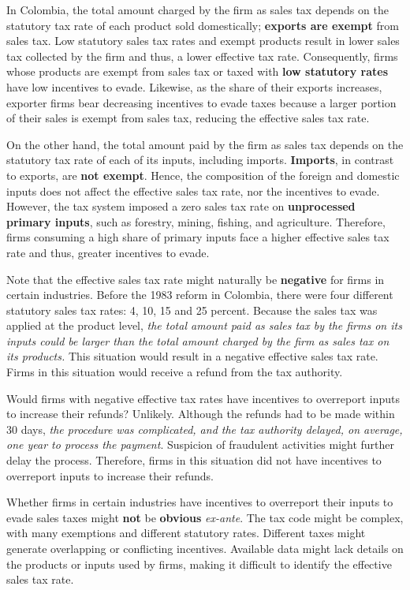 \documentclass[
  12pt]{article}
\theoremstyle{definition}
\theoremstyle{remark}
\begin{document}
In Colombia, the total amount charged by the firm as sales tax depends
on the statutory tax rate of each product sold domestically;
\textbf{exports are exempt} from sales tax. Low statutory sales tax
rates and exempt products result in lower sales tax collected by the
firm and thus, a lower effective tax rate. Consequently, firms whose
products are exempt from sales tax or taxed with \textbf{low statutory
rates} have low incentives to evade. Likewise, as the share of their
exports increases, exporter firms bear decreasing incentives to evade
taxes because a larger portion of their sales is exempt from sales tax,
reducing the effective sales tax rate.

On the other hand, the total amount paid by the firm as sales tax
depends on the statutory tax rate of each of its inputs, including
imports. \textbf{Imports}, in contrast to exports, are \textbf{not
exempt}. Hence, the composition of the foreign and domestic inputs does
not affect the effective sales tax rate, nor the incentives to evade.
However, the tax system imposed a zero sales tax rate on
\textbf{unprocessed primary inputs}, such as forestry, mining, fishing,
and agriculture. Therefore, firms consuming a high share of primary
inputs face a higher effective sales tax rate and thus, greater
incentives to evade.

Note that the effective sales tax rate might naturally be
\textbf{negative} for firms in certain industries. Before the 1983
reform in Colombia, there were four different statutory sales tax rates:
4, 10, 15 and 25 percent. Because the sales tax was applied at the
product level, \emph{the total amount paid as sales tax by the firms on
its inputs could be larger than the total amount charged by the firm as
sales tax on its products.} This situation would result in a negative
effective sales tax rate. Firms in this situation would receive a refund
from the tax authority.

Would firms with negative effective tax rates have incentives to
overreport inputs to increase their refunds? Unlikely. Although the
refunds had to be made within 30 days, \emph{the procedure was
complicated, and the tax authority delayed, on average, one year to
process the payment}. Suspicion of fraudulent activities might further
delay the process. Therefore, firms in this situation did not have
incentives to overreport inputs to increase their refunds.

Whether firms in certain industries have incentives to overreport their
inputs to evade sales taxes might \textbf{not} be \textbf{obvious}
\emph{ex-ante}. The tax code might be complex, with many exemptions and
different statutory rates. Different taxes might generate overlapping or
conflicting incentives. Available data might lack details on the
products or inputs used by firms, making it difficult to identify the
effective sales tax rate.
\end{document}
